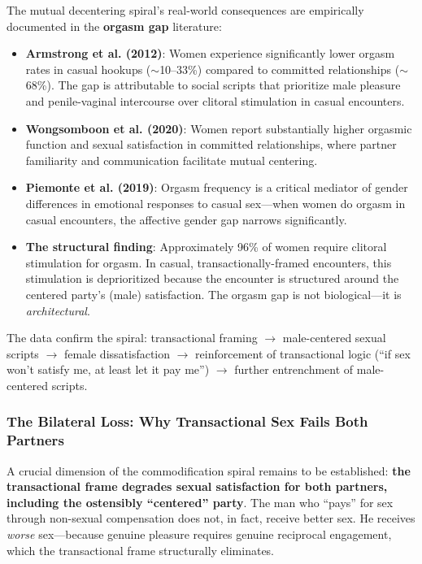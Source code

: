 \documentclass[12pt, letterpaper]{article}
\begin{document}
The mutual decentering spiral's real-world consequences are empirically documented in the \textbf{orgasm gap} literature:

\begin{itemize}
    \item \textbf{Armstrong et al. (2012)}: Women experience significantly lower orgasm rates in casual hookups ($\sim$10--33\%) compared to committed relationships ($\sim$68\%). The gap is attributable to social scripts that prioritize male pleasure and penile-vaginal intercourse over clitoral stimulation in casual encounters.
    
    \item \textbf{Wongsomboon et al. (2020)}: Women report substantially higher orgasmic function and sexual satisfaction in committed relationships, where partner familiarity and communication facilitate mutual centering.
    
    \item \textbf{Piemonte et al. (2019)}: Orgasm frequency is a critical mediator of gender differences in emotional responses to casual sex---when women do orgasm in casual encounters, the affective gender gap narrows significantly.
    
    \item \textbf{The structural finding}: Approximately 96\% of women require clitoral stimulation for orgasm. In casual, transactionally-framed encounters, this stimulation is deprioritized because the encounter is structured around the centered party's (male) satisfaction. The orgasm gap is not biological---it is \textit{architectural}.
\end{itemize}

The data confirm the spiral: transactional framing $\rightarrow$ male-centered sexual scripts $\rightarrow$ female dissatisfaction $\rightarrow$ reinforcement of transactional logic (``if sex won't satisfy me, at least let it pay me'') $\rightarrow$ further entrenchment of male-centered scripts.

\subsubsection{The Bilateral Loss: Why Transactional Sex Fails Both Partners}

A crucial dimension of the commodification spiral remains to be established: \textbf{the transactional frame degrades sexual satisfaction for both partners, including the ostensibly ``centered'' party}. The man who ``pays'' for sex through non-sexual compensation does not, in fact, receive better sex. He receives \textit{worse} sex---because genuine pleasure requires genuine reciprocal engagement, which the transactional frame structurally eliminates.
\end{document}
